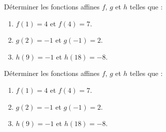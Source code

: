 \begin{exercice*}
    Déterminer les fonctions affines $f$, $g$ et $h$ telles que :
    \begin{enumerate}
        \item $f(1)=4$ et $f(4)=7$.
        \item $g(2)=-1$ et $g(-1)=2$.
        \item $h(9)=-1$ et $h(18)=-8$.
    \end{enumerate}
\end{exercice*}
\begin{corrige}
    Déterminer les fonctions affines $f$, $g$ et $h$ telles que :
    \begin{enumerate}
        \item $f(1)=4$ et $f(4)=7$.
        
        {\color{red} }
        \item $g(2)=-1$ et $g(-1)=2$.
        
        {\color{red} }
        \item $h(9)=-1$ et $h(18)=-8$.
        
        {\color{red} }
    \end{enumerate}
\end{corrige}
